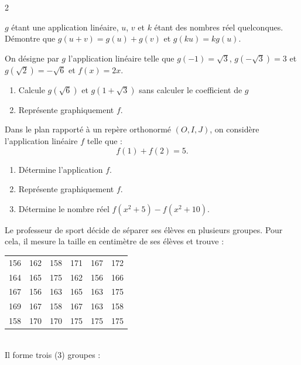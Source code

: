\begin{multicols*}{2}
 	
 	 
 	$ g $ étant une application linéaire, $ u $, $ v $ et $ k $ étant des nombres réel quelconques. Démontre que $ g(u+v)=g(u)+g(v) $ et $ g(ku)=kg(u) $. \\
 	\dures
 	 
 	On désigne par $ g $ l'application linéaire telle que $g(-1)=\sqrt{3}$, $g(-\sqrt{3})=3 $ et $ g(\sqrt{2})=-\sqrt{6} $ et $ f(x)=2x $.
 	\begin{enumerate}
 		\item  Calcule $ g(\sqrt{6}) $ et $ g(1+\sqrt{3}) $ sans calculer le coefficient de $g$
 		\item Représente graphiquement $f$.
 	\end{enumerate}
 	\dures
 	
 	\reto 
 	\begin{center}
 	\end{center}
  Dans le plan rapporté à un repère orthonormé $(O,I,J)$, on considère l'application linéaire $f$ telle que :
 	$$f(1)+f(2) = 5.$$
 	\begin{enumerate}
 		\item Détermine l'application $f$.
 		\item Représente graphiquement $f$.
 		\item Détermine le nombre réel $f(x^2+5)-f(x^2+10)$.
 	\end{enumerate}
 
 	\setcounter{q}{0}
 	Le professeur de sport décide de séparer ses élèves en plusieurs groupes. Pour cela, il mesure la taille en centimètre de ses élèves et trouve :
 	
 	\begin{tabular}{cccccc}
 		\hline
 		156 & 162 & 158 & 171 & 167 & 172 \\
 		164 & 165 & 175 & 162 & 156 & 166 \\
 		167 & 156 & 163 & 165 & 163 & 175 \\
 		169 & 167 & 158 & 167 & 163 & 158 \\
 		158 & 170 & 170 & 175 & 175 & 175 \\
 		\hline
 	\end{tabular} \\
 	Il forme trois (3) groupes :
 	

\end{multicols*}
